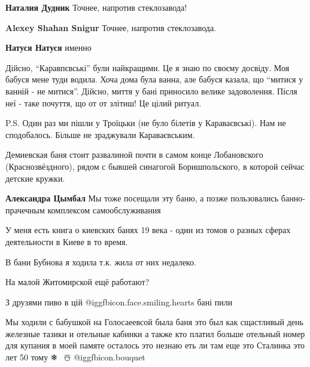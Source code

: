 \begin{itemize}
\begin{itemize}
\begin{itemize}
\textbf{Наталия Дудник} Точнее, напротив стеклозавода!

\textbf{Alexey Shahan Snigur} Точнее, напротив стеклозавода.

\textbf{Натуся Натуся} именно
\end{itemize} %

\end{itemize} %


Дійсно, \enquote{Каравпєвські} були найкращими. Це я знаю по своєму досвіду. Моя бабуся
мене туди водила. Хоча дома була ванна, але бабуся казала, що \enquote{митися у ванній
- не митися}. Дійсно, миття у бані приносило велике задоволення. Після неї -
таке почуття, що от от злітиш! Це цілий ритуал.

P.S. Один раз ми пішли у Троїцьки (не було білетів у Караваєвські). Нам не
сподобалось. Більше не зраджували Караваєвським.


Демиевская баня стоит развалиной почти в самом конце Лобановского
(Краснозвёздного), рядом с бывшей синагогой Боришпольского, в которой сейчас
детские кружки.

\textbf{Александра Цымбал} Мы тоже посещали эту баню, а позже пользовались банно-прачечным комплексом самообслуживания

У меня есть книга о киевских банях 19 века - один из томов о разных сферах деятельности в Киеве в то время.

В бани Бубнова я ходила т.к. жила от них недалеко.

На малой Житомирской ещё работают?

З друзями пиво в цій  @igg{fbicon.face.smiling.hearts} бані пили


Мы ходили с бабушкой на Голосаеевсой была баня это был как сщастливый день
железные тазики и отельные кабинки а также кто платил больше отельный номер для
купания в моей памяте осталось это незнаю еть ли там еще это Сталинка это лет 50
тому  ❄ ️ ☃️ @igg{fbicon.bouquet} 

\end{itemize} %
